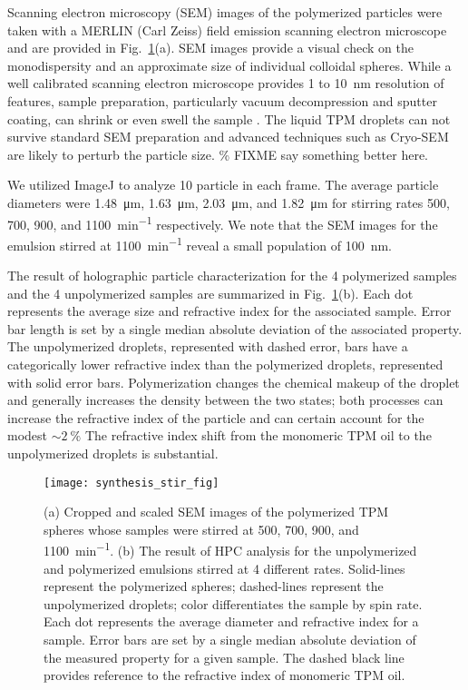 Scanning electron microscopy (SEM) images of the polymerized particles were taken with a
MERLIN (Carl Zeiss) field emission scanning electron microscope and are provided in
Fig.~\ref{fig:synthesis_stir_rate}(a). SEM images provide a visual check on the monodispersity
and an approximate size of individual colloidal spheres. While a well calibrated scanning
electron microscope provides \num{1} to \SI{10}{\nm} resolution of features, sample
preparation, particularly vacuum decompression and sputter coating, can shrink or
even swell the sample \cite{yamada85,jung02}. The liquid TPM droplets can not survive
standard SEM preparation and advanced techniques such as Cryo-SEM are likely to
perturb the particle size. \% FIXME say something better here.

We utilized ImageJ to analyze \num{10}
particle in each frame. The average particle diameters were \SI{1.48}{\um}, \SI{1.63}{\um},
\SI{2.03}{\um}, and \SI{1.82}{\um} for stirring rates \num{500}, \num{700}, \num{900}, and
\SI{1100}{\minute^{-1}} respectively. We note that the SEM images for the emulsion
stirred at \SI{1100}{\minute^{-1}} reveal a small population of \SI{100}{\nm}.

The result of holographic particle characterization for the \num{4} polymerized samples
and the \num{4} unpolymerized samples are summarized in Fig.~\ref{fig:synthesis_stir_rate}(b).
Each dot represents the average size and refractive index for the associated sample. Error
bar length is set by a single median absolute deviation of the associated property.
The unpolymerized droplets, represented with dashed error, bars have a categorically
lower refractive index than the polymerized droplets, represented with solid error bars.
Polymerization changes the chemical makeup of the droplet and generally increases the
density between the two states; both processes can increase the refractive index
of the particle and can certain account for the modest $\sim\SI{2}{\percent}$ %
The refractive index shift from the monomeric TPM oil to the unpolymerized droplets
is substantial.

\begin{figure}
    \centering
    \texttt{[image: synthesis\_stir\_fig]}
    \caption{(a) Cropped and scaled SEM images of the polymerized TPM spheres whose
      samples were stirred at \num{500}, \num{700}, \num{900}, and \SI{1100}{\minute^{-1}}.
      (b)  The result of HPC analysis for the unpolymerized and polymerized
      emulsions stirred at \num{4} different rates. Solid-lines represent the polymerized
      spheres; dashed-lines represent the unpolymerized droplets; color differentiates the sample by
      spin rate. Each dot represents the
      average diameter and refractive index for a sample. Error bars are set by a single
      median absolute deviation of the measured property for a given sample. The dashed
      black line provides reference to the refractive index of monomeric TPM oil.}
    \label{fig:synthesis_stir_rate}
\end{figure}


